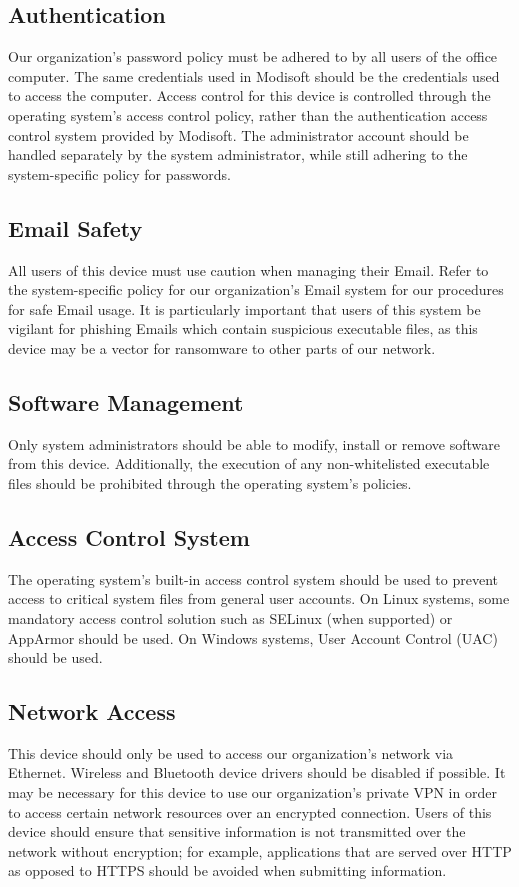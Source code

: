 \documentclass[11pt]{article}
\begin{document}
\subsection{Authentication}
\label{sec:org5cd78ca}
Our organization's password policy must be adhered to by all users of the office computer. The same credentials used in Modisoft should be the credentials used to access the computer. Access control for this device is controlled through the operating system's access control policy, rather than the authentication access control system provided by Modisoft. The administrator account should be handled separately by the system administrator, while still adhering to the system-specific policy for passwords.

\subsection{Email Safety}
\label{sec:org3c3c0df}
All users of this device must use caution when managing their Email. Refer to the system-specific policy for our organization's Email system for our procedures for safe Email usage. It is particularly important that users of this system be vigilant for phishing Emails which contain suspicious executable files, as this device may be a vector for ransomware to other parts of our network.

\subsection{Software Management}
\label{sec:org1c714fa}
Only system administrators should be able to modify, install or remove software from this device. Additionally, the execution of any non-whitelisted executable files should be prohibited through the operating system's policies.

\subsection{Access Control System}
\label{sec:orgbde2814}
The operating system's built-in access control system should be used to prevent access to critical system files from general user accounts. On Linux systems, some mandatory access control solution such as SELinux (when supported) or AppArmor should be used. On Windows systems, User Account Control (UAC) should be used.

\subsection{Network Access}
\label{sec:org1ca9e86}
This device should only be used to access our organization's network via Ethernet. Wireless and Bluetooth device drivers should be disabled if possible. It may be necessary for this device to use our organization's private VPN in order to access certain network resources over an encrypted connection. Users of this device should ensure that sensitive information is not transmitted over the network without encryption; for example, applications that are served over HTTP as opposed to HTTPS should be avoided when submitting information.
\end{document}
